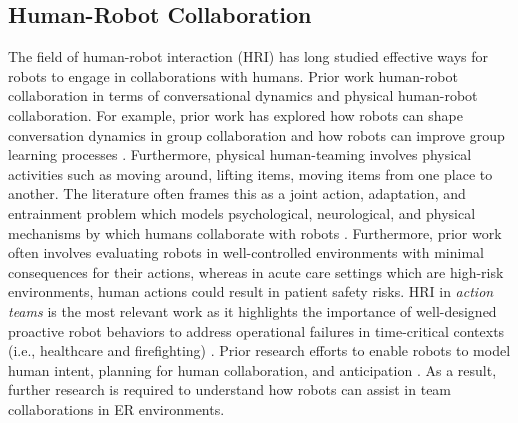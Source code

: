 \subsection{Human-Robot Collaboration} 

The field of human-robot interaction (HRI) has long studied effective ways for robots to engage in collaborations with humans. 
Prior work human-robot collaboration in terms of conversational dynamics and physical human-robot collaboration.%
For example, prior work has explored how robots can shape conversation dynamics in group collaboration \cite{tennent2019micbot,taylor2016robot} and how robots can improve group learning processes \cite{alves2019empathic}. 
Furthermore, physical human-teaming involves physical activities such as moving around, lifting items, moving items from one place to another. 
The literature often frames this as a joint action, adaptation, and entrainment problem which models psychological, neurological, and physical mechanisms by which humans collaborate with robots \cite{fourie2022joint,iqbal2016movement,iqbal2017coordination}. 
Furthermore, prior work often involves evaluating robots in well-controlled environments with minimal consequences for their actions, whereas in acute care settings which are high-risk environments, human actions could result in patient safety risks. 
HRI in \textit{action teams} is the most relevant work as it highlights the importance of well-designed proactive robot behaviors to address operational failures in time-critical contexts (i.e., healthcare and firefighting) \cite{jamshad2024taking}. 
Prior research efforts to enable robots to model human intent, planning for human collaboration, and anticipation \cite{levine2014concurrent,nikolaidis2013human,dominey2008anticipation,hoffman2007effects}.
As a result, further research is required to understand how robots can assist in team collaborations in ER environments.


